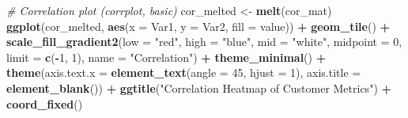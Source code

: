 \documentclass[
]{article}
\newenvironment{Shaded}{\begin{snugshade}}{\end{snugshade}}
\newcommand{\AttributeTok}[1]{\textcolor[rgb]{0.13,0.29,0.53}{#1}}
\newcommand{\CommentTok}[1]{\textcolor[rgb]{0.56,0.35,0.01}{\textit{#1}}}
\newcommand{\DecValTok}[1]{\textcolor[rgb]{0.00,0.00,0.81}{#1}}
\newcommand{\FunctionTok}[1]{\textcolor[rgb]{0.13,0.29,0.53}{\textbf{#1}}}
\newcommand{\NormalTok}[1]{#1}
\newcommand{\OtherTok}[1]{\textcolor[rgb]{0.56,0.35,0.01}{#1}}
\newcommand{\SpecialCharTok}[1]{\textcolor[rgb]{0.81,0.36,0.00}{\textbf{#1}}}
\newcommand{\StringTok}[1]{\textcolor[rgb]{0.31,0.60,0.02}{#1}}
\begin{document}
\begin{Shaded}
\begin{Highlighting}[]
\CommentTok{\# Correlation plot (corrplot, basic)}
\NormalTok{cor\_melted }\OtherTok{\textless{}{-}} \FunctionTok{melt}\NormalTok{(cor\_mat)}
\FunctionTok{ggplot}\NormalTok{(cor\_melted, }\FunctionTok{aes}\NormalTok{(}\AttributeTok{x =}\NormalTok{ Var1, }\AttributeTok{y =}\NormalTok{ Var2, }\AttributeTok{fill =}\NormalTok{ value)) }\SpecialCharTok{+}
  \FunctionTok{geom\_tile}\NormalTok{() }\SpecialCharTok{+}
  \FunctionTok{scale\_fill\_gradient2}\NormalTok{(}\AttributeTok{low =} \StringTok{"red"}\NormalTok{, }\AttributeTok{high =} \StringTok{"blue"}\NormalTok{, }\AttributeTok{mid =} \StringTok{"white"}\NormalTok{, }
                       \AttributeTok{midpoint =} \DecValTok{0}\NormalTok{, }\AttributeTok{limit =} \FunctionTok{c}\NormalTok{(}\SpecialCharTok{{-}}\DecValTok{1}\NormalTok{, }\DecValTok{1}\NormalTok{), }
                       \AttributeTok{name =} \StringTok{"Correlation"}\NormalTok{) }\SpecialCharTok{+}
  \FunctionTok{theme\_minimal}\NormalTok{() }\SpecialCharTok{+}
  \FunctionTok{theme}\NormalTok{(}\AttributeTok{axis.text.x =} \FunctionTok{element\_text}\NormalTok{(}\AttributeTok{angle =} \DecValTok{45}\NormalTok{, }\AttributeTok{hjust =} \DecValTok{1}\NormalTok{),}
        \AttributeTok{axis.title =} \FunctionTok{element\_blank}\NormalTok{()) }\SpecialCharTok{+}
  \FunctionTok{ggtitle}\NormalTok{(}\StringTok{"Correlation Heatmap of Customer Metrics"}\NormalTok{) }\SpecialCharTok{+}
  \FunctionTok{coord\_fixed}\NormalTok{()}
\end{Highlighting}
\end{Shaded}
\end{document}

